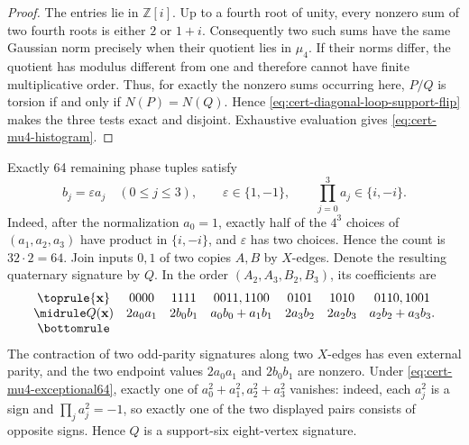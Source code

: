 \documentclass[11pt,letterpaper,onecolumn]{article}
\theoremstyle{plain}
\theoremstyle{definition}
\theoremstyle{remark}
\newcommand{\eps}{\varepsilon}
\begin{document}
\begin{proof}
The entries lie in \(\mathbb Z[i]\).  Up to a fourth root of unity, every
nonzero sum of two fourth roots is either \(2\) or \(1+i\).
Consequently two such sums have the same Gaussian norm precisely when their
quotient lies in \(\mu_4\).  If their norms differ, the
quotient has modulus different from one and therefore cannot have finite
multiplicative order.  Thus, for exactly the nonzero sums occurring here,
\(P/Q\) is torsion if and only if \(N(P)=N(Q)\).  Hence
\cref{eq:cert-diagonal-loop-support-flip} makes the three tests exact and
disjoint. Exhaustive evaluation gives \cref{eq:cert-mu4-histogram}.
\end{proof}

Exactly 64 remaining phase tuples satisfy
\begin{equation}
 b_j=\eps a_j\quad(0\leq j\leq3),\qquad
 \eps\in\{1,-1\},\qquad \prod_{j=0}^3a_j\in\{i,-i\}.
  \label{eq:cert-mu4-exceptional64}
\end{equation}
Indeed, after the normalization \(a_0=1\), exactly half of the \(4^3\)
choices of \((a_1,a_2,a_3)\) have product in \(\{i,-i\}\), and \(\eps\)
has two choices. Hence the count is \(32\cdot2=64\).
Join inputs \(0,1\) of two copies \(A,B\) by \(X\)-edges.  Denote the
resulting quaternary signature by \(Q\).  In the order
\((A_2,A_3,B_2,B_3)\), its coefficients are
\[
\begin{array}{ccccccc}
\toprule
{\mathbf{x}}&0000&1111&0011,1100&0101&1010&0110,1001\\ \midrule
Q({\mathbf{x}})&2a_0a_1&2b_0b_1&a_0b_0+a_1b_1&2a_3b_2&2a_2b_3&
a_2b_2+a_3b_3.\\
\bottomrule
\end{array}
\]
The contraction of two odd-parity signatures along two \(X\)-edges has even
external parity, and the two endpoint values \(2a_0a_1\) and \(2b_0b_1\)
are nonzero.  Under \cref{eq:cert-mu4-exceptional64}, exactly one of
\(a_0^2+a_1^2,a_2^2+a_3^2\) vanishes: indeed, each \(a_j^2\) is a sign and
\(\prod_j a_j^2=-1\), so exactly one of the two displayed pairs consists of
opposite signs.  Hence \(Q\) is a support-six eight-vertex signature.
\end{document}
